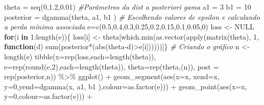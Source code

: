 \documentclass[
]{book}
\newenvironment{Shaded}{\begin{snugshade}}{\end{snugshade}}
\newcommand{\AttributeTok}[1]{\textcolor[rgb]{0.77,0.63,0.00}{#1}}
\newcommand{\CommentTok}[1]{\textcolor[rgb]{0.56,0.35,0.01}{\textit{#1}}}
\newcommand{\ConstantTok}[1]{\textcolor[rgb]{0.00,0.00,0.00}{#1}}
\newcommand{\ControlFlowTok}[1]{\textcolor[rgb]{0.13,0.29,0.53}{\textbf{#1}}}
\newcommand{\DecValTok}[1]{\textcolor[rgb]{0.00,0.00,0.81}{#1}}
\newcommand{\FloatTok}[1]{\textcolor[rgb]{0.00,0.00,0.81}{#1}}
\newcommand{\FunctionTok}[1]{\textcolor[rgb]{0.00,0.00,0.00}{#1}}
\newcommand{\NormalTok}[1]{#1}
\newcommand{\OtherTok}[1]{\textcolor[rgb]{0.56,0.35,0.01}{#1}}
\newcommand{\SpecialCharTok}[1]{\textcolor[rgb]{0.00,0.00,0.00}{#1}}
\begin{document}
\begin{Shaded}
\begin{Highlighting}[]
\NormalTok{theta }\OtherTok{=} \FunctionTok{seq}\NormalTok{(}\DecValTok{0}\NormalTok{,}\FloatTok{1.2}\NormalTok{,}\FloatTok{0.01}\NormalTok{)}
\CommentTok{\#Parâmetros da dist a posteriori gama}
\NormalTok{a1 }\OtherTok{=} \DecValTok{3}
\NormalTok{b1 }\OtherTok{=} \DecValTok{10}
\NormalTok{posterior }\OtherTok{=} \FunctionTok{dgamma}\NormalTok{(theta, a1, b1 )}
\CommentTok{\# Escolhendo valores de epsilon e calculando a perda mínima associada}
\NormalTok{e}\OtherTok{=}\FunctionTok{c}\NormalTok{(}\FloatTok{0.5}\NormalTok{,}\FloatTok{0.4}\NormalTok{,}\FloatTok{0.3}\NormalTok{,}\FloatTok{0.25}\NormalTok{,}\FloatTok{0.2}\NormalTok{,}\FloatTok{0.15}\NormalTok{,}\FloatTok{0.1}\NormalTok{,}\FloatTok{0.05}\NormalTok{,}\DecValTok{0}\NormalTok{)}
\NormalTok{loss }\OtherTok{\textless{}{-}} \ConstantTok{NULL}
\ControlFlowTok{for}\NormalTok{(i }\ControlFlowTok{in} \DecValTok{1}\SpecialCharTok{:}\FunctionTok{length}\NormalTok{(e))\{}
\NormalTok{  loss[i] }\OtherTok{\textless{}{-}}\NormalTok{ theta[}\FunctionTok{which.min}\NormalTok{(}\FunctionTok{as.vector}\NormalTok{(}\FunctionTok{apply}\NormalTok{(}\FunctionTok{matrix}\NormalTok{(theta), }\DecValTok{1}\NormalTok{,}
                                              \ControlFlowTok{function}\NormalTok{(d) }\FunctionTok{sum}\NormalTok{(posterior}\SpecialCharTok{*}\NormalTok{(}\FunctionTok{abs}\NormalTok{(theta}\SpecialCharTok{{-}}\NormalTok{d)}\SpecialCharTok{\textgreater{}}\NormalTok{e[i])))))]\}}
\CommentTok{\# Criando o gráfico }
\NormalTok{n }\OtherTok{\textless{}{-}} \FunctionTok{length}\NormalTok{(e)}
\FunctionTok{tibble}\NormalTok{(}\AttributeTok{x=}\FunctionTok{rep}\NormalTok{(loss,}\AttributeTok{each=}\FunctionTok{length}\NormalTok{(theta)),}
       \AttributeTok{e=}\FunctionTok{rep}\NormalTok{(}\FunctionTok{round}\NormalTok{(e,}\DecValTok{2}\NormalTok{),}\AttributeTok{each=}\FunctionTok{length}\NormalTok{(theta)),}
       \AttributeTok{theta=}\FunctionTok{rep}\NormalTok{(theta,(n)), }\AttributeTok{post =} \FunctionTok{rep}\NormalTok{(posterior,n)) }\SpecialCharTok{\%\textgreater{}\%} 
  \FunctionTok{ggplot}\NormalTok{() }\SpecialCharTok{+} 
  \FunctionTok{geom\_segment}\NormalTok{(}\FunctionTok{aes}\NormalTok{(}\AttributeTok{x=}\NormalTok{x, }\AttributeTok{xend=}\NormalTok{x, }\AttributeTok{y=}\DecValTok{0}\NormalTok{,}\AttributeTok{yend=}\FunctionTok{dgamma}\NormalTok{(x, a1, b1 ),}\AttributeTok{colour=}\FunctionTok{as.factor}\NormalTok{(e))) }\SpecialCharTok{+}
  \FunctionTok{geom\_point}\NormalTok{(}\FunctionTok{aes}\NormalTok{(}\AttributeTok{x=}\NormalTok{x, }\AttributeTok{y=}\DecValTok{0}\NormalTok{,}\AttributeTok{colour=}\FunctionTok{as.factor}\NormalTok{(e))) }\SpecialCharTok{+}

\end{Highlighting}
\end{Shaded}
\end{document}
